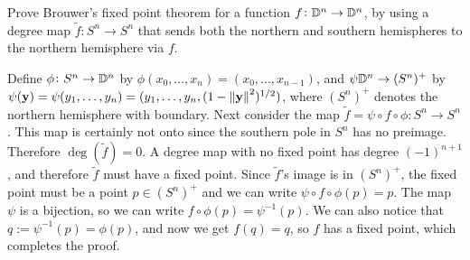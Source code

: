 \documentclass[11pt,a4paper]{article}
\begin{document}
\begin{exercise}
  Prove Brouwer's fixed point theorem for a function $f \colon \mathbb{D}^n \to \mathbb{D}^n$,
  by using a degree map $\tilde f \colon S^n \to S^n$ that sends both
  the northern and southern hemispheres to the northern hemisphere via $f$.
\end{exercise}
\begin{solution}
  Define $\phi \colon S^n \to \mathbb{D}^n$ by
  $\phi(x_0,\dots,x_n) = (x_0,\dots,x_{n-1})$,
  and $\psi \mathbb{D}^n \to (S^n)^+$ by
  $\psi(\boldsymbol{\mathbf{y}}) = \psi(y_1,\dots,y_n) =
  (y_1,\dots,y_n,(1-\left\lVert\boldsymbol{\mathbf{y}}\right\rVert^2)^{1/2})$,
  where $(S^n)^+$ denotes the northern hemisphere with boundary.
  Next consider the map $\tilde f = \psi \circ f \circ \phi \colon S^n \to S^n$.
  This map is certainly not onto since the southern pole in $S^n$
  has no preimage. Therefore $\deg(\tilde f) = 0$.
  A degree map with no fixed point has degree $(-1)^{n+1}$,
  and therefore $\tilde f$ must have a fixed point.
  Since $\tilde f$'s image is in $(S^n)^+$, the fixed point must be a point
  $p \in (S^n)^+$ and we can write $\psi \circ f \circ \phi(p) = p$.
  The map $\psi$ is a bijection,
  so we can write $f \circ \phi(p) = \psi^{-1}(p)$.
  We can also notice that $q := \psi^{-1}(p) = \phi(p)$,
  and now we get $f(q) = q$,
  so $f$ has a fixed point, which completes the proof.
\end{solution}
\end{document}
